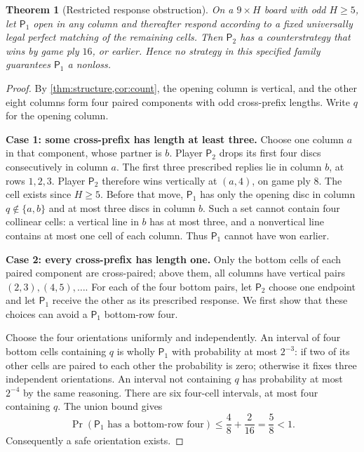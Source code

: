 \documentclass[11pt]{article}
\newtheorem{theorem}{Theorem}[section]
\theoremstyle{definition}
\theoremstyle{remark}
\newcommand{\Pone}{\mathsf{P}_1}
\newcommand{\Ptwo}{\mathsf{P}_2}
\begin{document}
\begin{theorem}[Restricted response obstruction]\label{thm:obstruction}
On a $9\times H$ board with odd $H\ge5$, let $\Pone$ open in any column
and thereafter respond according to a fixed universally legal perfect
matching of the remaining cells. Then $\Ptwo$ has a counterstrategy that
wins by game ply $16$, or earlier. Hence no strategy in this specified
family guarantees $\Pone$ a nonloss.
\end{theorem}
\begin{proof}
By \cref{thm:structure,cor:count}, the opening column is vertical, and the
other eight columns form four paired components with odd cross-prefix
lengths. Write $q$ for the opening column.

\textbf{Case 1: some cross-prefix has length at least three.}
Choose one column $a$ in that component, whose partner is $b$. Player
$\Ptwo$ drops its first four discs consecutively in column $a$.
The first three prescribed replies lie in column $b$, at rows $1,2,3$.
Player $\Ptwo$ therefore wins vertically at $(a,4)$, on game ply $8$.
The cell exists since $H\ge5$. Before that move, $\Pone$ has only the
opening disc in column $q\notin\{a,b\}$ and at most three discs in column
$b$. Such a set cannot contain four collinear cells: a vertical line in
$b$ has at most three, and a nonvertical line contains at most one cell
of each column. Thus $\Pone$ cannot have won earlier.

\textbf{Case 2: every cross-prefix has length one.}
Only the bottom cells of each paired component are cross-paired; above
them, all columns have vertical pairs $(2,3),(4,5),\ldots$.
For each of the four bottom pairs, let $\Ptwo$ choose one endpoint and let
$\Pone$ receive the other as its prescribed response. We first show that
these choices can avoid a $\Pone$ bottom-row four.

Choose the four orientations uniformly and independently. An interval of
four bottom cells containing $q$ is wholly $\Pone$ with probability at
most $2^{-3}$: if two of its other cells are paired to each other the
probability is zero; otherwise it fixes three independent orientations.
An interval not containing $q$ has probability at most $2^{-4}$ by the
same reasoning. There are six four-cell intervals, at most four containing
$q$. The union bound gives
\begin{equation}\label{eq:union}
 \Pr(\text{$\Pone$ has a bottom-row four})
 \le \frac4{8}+\frac2{16}=\frac58<1.
\end{equation}
Consequently a safe orientation exists.


\end{proof}
\end{document}
